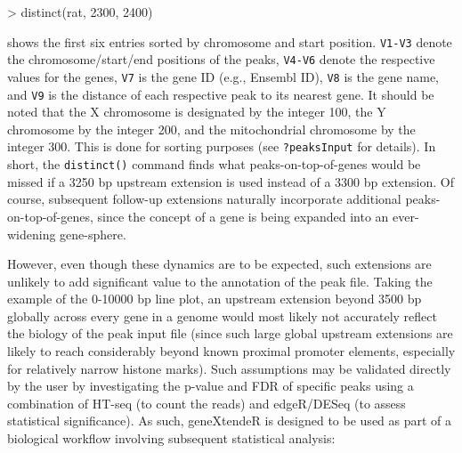 \documentclass[12pt]{article}
\begin{document}
\begin{Schunk}
\begin{Sinput}
> distinct(rat, 2300, 2400)
\end{Sinput}
\end{Schunk}

shows the first six entries sorted by chromosome and start position.  \texttt{V1-V3} denote the chromosome/start/end positions of the peaks, \texttt{V4-V6} denote the respective values for the genes, \texttt{V7} is the gene ID (e.g., Ensembl ID), \texttt{V8} is the gene name, and \texttt{V9} is the distance of each respective peak to its nearest gene.  It should be noted that the X chromosome is designated by the integer 100, the Y chromosome by the integer 200, and the mitochondrial chromosome by the integer 300.  This is done for sorting purposes (see \texttt{?peaksInput} for details).  In short, the \texttt{distinct()} command finds what peaks-on-top-of-genes would be missed if a 3250 bp upstream extension is used instead of a 3300 bp extension.  Of course, subsequent follow-up extensions naturally incorporate additional peaks-on-top-of-genes, since the concept of a gene is being expanded into an ever-widening gene-sphere.  

However, even though these dynamics are to be expected, such extensions are unlikely to add significant value to the annotation of the peak file.  Taking the example of the 0-10000 bp line plot, an upstream extension beyond 3500 bp globally across every gene in a genome would most likely not accurately reflect the biology of the peak input file (since such large global upstream extensions are likely to reach considerably beyond known proximal promoter elements, especially for relatively narrow histone marks).  Such assumptions may be validated directly by the user by investigating the p-value and FDR of specific peaks using a combination of HT-seq (to count the reads) and edgeR/DESeq (to assess statistical significance).  As such, geneXtendeR is designed to be used as part of a biological workflow involving subsequent statistical analysis:
\end{document}

